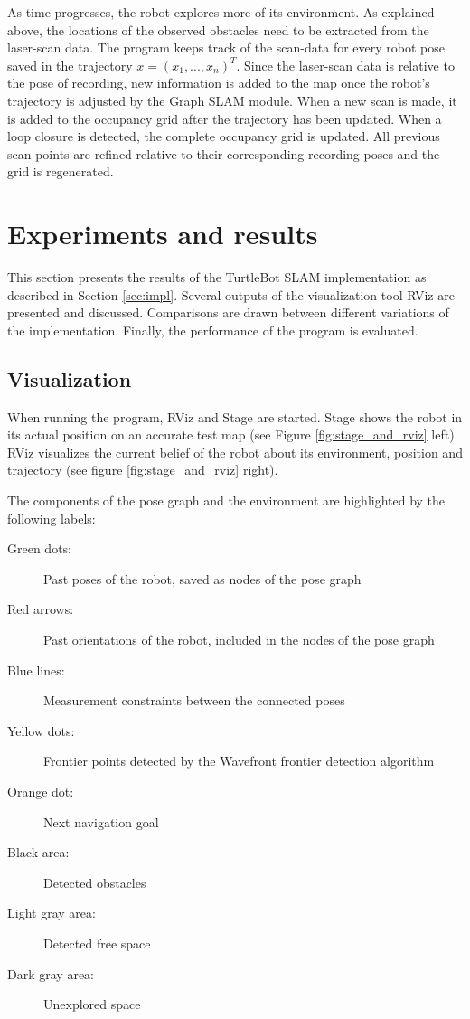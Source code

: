 \documentclass{ba-kecs}
\begin{document}
As time progresses, the robot explores more of its environment. As explained above, the locations of the observed obstacles need to be extracted from the laser-scan data. The program keeps track of the scan-data for every robot pose saved in the trajectory \(x = (x_1, ..., x_n)^T \). Since the laser-scan data is relative to the pose of recording, new information is added to the map once the robot's trajectory is adjusted by the Graph SLAM module. When a new scan is made, it is added to the occupancy grid after the trajectory has been updated. When a loop closure is detected, the complete occupancy grid is updated. All previous scan points are refined relative to their corresponding recording poses and the grid is regenerated.

\section{Experiments and results}
\label{sec:exp}
This section presents the results of the TurtleBot SLAM implementation as described in Section \ref{sec:impl}. Several outputs of the visualization tool RViz are presented and discussed. Comparisons are drawn between different variations of the implementation. Finally, the performance of the program is evaluated.

\subsection{Visualization}
\label{sec:visual}
When running the program, RViz and Stage are started. Stage shows the robot in its actual position on an accurate test map (see Figure \ref{fig:stage_and_rviz} left). RViz visualizes the current belief of the robot about its environment, position and trajectory (see figure \ref{fig:stage_and_rviz} right).

The components of the pose graph and the environment are highlighted by the following labels:

\begin{description}
\item[Green dots:]Past poses of the robot, saved as nodes of the pose graph
\item[Red arrows:]Past orientations of the robot, included in the nodes of the pose graph
\item[Blue lines:]Measurement constraints between the connected poses
\item[Yellow dots:]Frontier points detected by the Wavefront frontier detection algorithm
\item[Orange dot:]Next navigation goal
\item[Black area:]Detected obstacles
\item[Light gray area:]Detected free space
\item[Dark gray area:]Unexplored space
\end{description}
\end{document}
